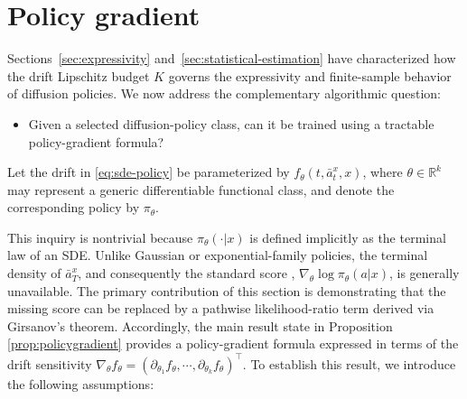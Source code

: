 \documentclass{article}
\newcommand{\1}{\mathbbm{1}}
\numberwithin{equation}{section}
\def\sR{{\mathbb R}}
\begin{document}
\section{Policy gradient}\label{sec:policy gradient}\label{sec:policy_gradient}

Sections~\ref{sec:expressivity} and~\ref{sec:statistical-estimation} have characterized how the drift Lipschitz budget \(K\) governs the expressivity and finite-sample behavior of diffusion policies. We now address the complementary algorithmic question:
\begin{itemize}
    \item Given a selected diffusion-policy class, can it be trained using a tractable policy-gradient formula?
\end{itemize}
Let the drift in \eqref{eq:sde-policy} be parameterized by
\(f_\theta(t,\bar a_t^x,x)\), where \(\theta\in\sR^k\) may represent a generic
differentiable functional class, and denote the corresponding policy by
\(\pi_\theta\).  

This inquiry is nontrivial because \(\pi_\theta(\cdot|x)\) is defined implicitly as the terminal law of an SDE. Unlike Gaussian or exponential-family policies, the terminal density of \(\bar a_T^x\), and consequently the standard score 
, \(\nabla_\theta\log \pi_\theta(a|x)\), is generally unavailable. The primary contribution of this section is demonstrating that the missing score can be replaced by a pathwise likelihood-ratio term derived via Girsanov's theorem. Accordingly, the main result state in Proposition \ref{prop:policygradient} provides a policy-gradient formula expressed in terms of the drift sensitivity
\(\nabla_\theta f_\theta=(\partial_{\theta_1}f_\theta,\cdots,\partial_{\theta_k}f_\theta)^\top\). To establish this result, we introduce the following assumptions:
\end{document}

